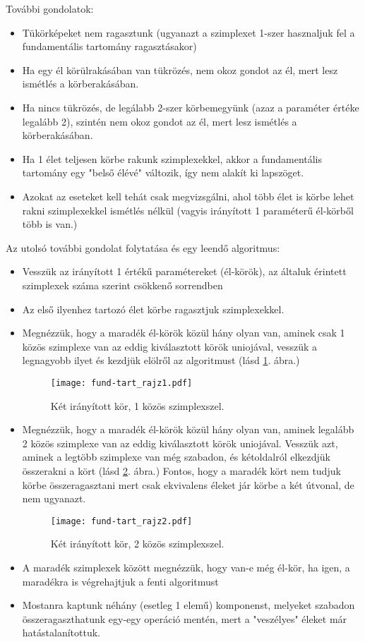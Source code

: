 \documentclass[12pt,magyar,a4paper]{article}
\begin{document}
További gondolatok:
\begin{itemize}
  \item Tükörképeket nem ragasztunk (ugyanazt a szimplexet 1-szer hasznaljuk fel
    a fundamentális tartomány ragasztásakor)
  \item Ha egy él körülrakásában van tükrözés, nem okoz gondot az él, mert lesz
    ismétlés a körberakásában.
  \item Ha nincs tükrözés, de legálabb 2-szer körbemegyünk (azaz a paraméter
    értéke legalább 2), szintén nem okoz gondot az él, mert lesz ismétlés a
    körberakásában.
  \item Ha 1 élet teljesen körbe rakunk szimplexekkel, akkor a fundamentális
    tartomány egy "belső élévé" változik, így nem alakít ki lapszöget.
  \item Azokat az eseteket kell tehát csak megvizsgálni, ahol több élet is körbe
    lehet rakni szimplexekkel ismétlés nélkül (vagyis irányított 1 paraméterű
    él-körből több is van.)
\end{itemize}

Az utolsó további gondolat folytatása és egy leendő algoritmus:
\begin{itemize}
  \item Vesszük az irányított 1 értékű paramétereket (él-körök), az általuk
    érintett szimplexek száma szerint csökkenő sorrendben
  \item Az első ilyenhez tartozó élet körbe ragasztjuk szimplexekkel.
  \item Megnézzük, hogy a maradék él-körök közül hány olyan van, aminek csak 1
    közös szimplexe van az eddig kiválasztott körök uniojával, vesszük a
    legnagyobb ilyet és kezdjük elölről az algoritmust (lásd \ref{ftrajz1}. ábra.)
    \begin{figure}
      \caption{\label{ftrajz1} Két irányított kör, 1 közös szimplexszel.}
      \center
      \texttt{[image: fund-tart\_rajz1.pdf]}
    \end{figure}
  \item Megnézzük, hogy a maradék él-körök közül hány olyan van, aminek legalább
    2 közös szimplexe van az eddig kiválasztott körök uniojával. Vesszük azt,
    aminek a legtöbb szimplexe van még szabadon, és kétoldalról elkezdjük
    összerakni a kört (lásd \ref{ftrajz2}. ábra.) Fontos, hogy a maradék
    kört nem tudjuk körbe összeragasztani mert csak ekvivalens éleket jár
    körbe a két útvonal, de nem ugyanazt.
    \begin{figure}
      \caption{\label{ftrajz2} Két irányított kör, 2 közös szimplexszel.}
      \center
      \texttt{[image: fund-tart\_rajz2.pdf]}
    \end{figure}
  \item A maradék szimplexek között megnézzük, hogy van-e még él-kör, ha igen,
    a maradékra is végrehajtjuk a fenti algoritmust
  \item Mostanra kaptunk néhány (esetleg 1 elemű) komponenst, melyeket szabadon
    összeragaszthatunk egy-egy operáció mentén, mert a "veszélyes" éleket már
    hatástalanítottuk.
\end{itemize}
\end{document}
